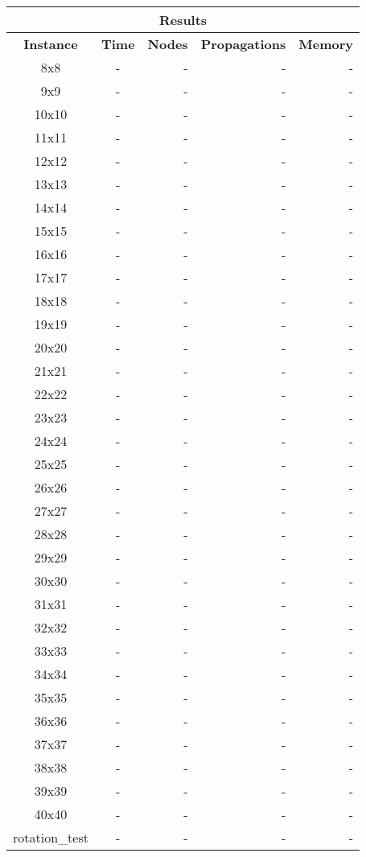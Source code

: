 
\begin{center}
    \begin{tabular}{|c|c|r|r|r|}
        \hline
        \multicolumn{5}{|c|}{\textbf{Results}} \\
        \hline
        \textbf{Instance} & \textbf{Time} & \textbf{Nodes} & \textbf{Propagations} & \textbf{Memory} \\
        
        \hline
		8x8 & - & - & - & - \\ \hline
		9x9 & - & - & - & - \\ \hline
		10x10 & - & - & - & - \\ \hline
		11x11 & - & - & - & - \\ \hline
		12x12 & - & - & - & - \\ \hline
		13x13 & - & - & - & - \\ \hline
		14x14 & - & - & - & - \\ \hline
		15x15 & - & - & - & - \\ \hline
		16x16 & - & - & - & - \\ \hline
		17x17 & - & - & - & - \\ \hline
		18x18 & - & - & - & - \\ \hline
		19x19 & - & - & - & - \\ \hline
		20x20 & - & - & - & - \\ \hline
		21x21 & - & - & - & - \\ \hline
		22x22 & - & - & - & - \\ \hline
		23x23 & - & - & - & - \\ \hline
		24x24 & - & - & - & - \\ \hline
		25x25 & - & - & - & - \\ \hline
		26x26 & - & - & - & - \\ \hline
		27x27 & - & - & - & - \\ \hline
		28x28 & - & - & - & - \\ \hline
		29x29 & - & - & - & - \\ \hline
		30x30 & - & - & - & - \\ \hline
		31x31 & - & - & - & - \\ \hline
		32x32 & - & - & - & - \\ \hline
		33x33 & - & - & - & - \\ \hline
		34x34 & - & - & - & - \\ \hline
		35x35 & - & - & - & - \\ \hline
		36x36 & - & - & - & - \\ \hline
		37x37 & - & - & - & - \\ \hline
		38x38 & - & - & - & - \\ \hline
		39x39 & - & - & - & - \\ \hline
		40x40 & - & - & - & - \\ \hline
		rotation\_test & - & - & - & - \\ \hline

    \end{tabular}
\end{center}
